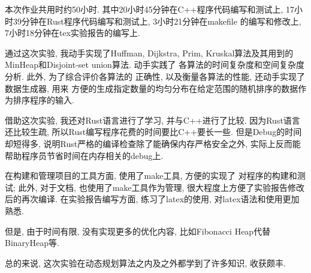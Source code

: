\label{ssub:实验心得}
本次作业共用时约50小时. 其中20小时45分钟在C++程序代码编写和测试上,
17小时39分钟在Rust程序代码编写和测试上, 3小时21分钟在makefile
的编写和修改上, 7小时18分钟在tex实验报告的编写上.\par

通过这次实验, 我动手实现了Huffman, Dijkstra, Prim,
Kruskal算法及其用到的MinHeap和Disjoint-set union算法. 动手实践了
各算法的时间复杂度和空间复杂度分析. 此外, 为了综合评价各算法的
正确性, 以及衡量各算法的性能, 还动手实现了数据生成器, 用来
方便的生成指定数量的均匀分布在给定范围的随机排序的数据作为排序程序的输入.\par

借助这次实验, 我还对Rust语言进行了学习, 并与C++进行了比较.
因为Rust语言还比较生疏, 所以Rust编写程序花费的时间要比C++要长一些.
但是Debug的时间却短得多, 说明Rust严格的编译检查除了能确保内存严格安全之外,
实际上反而能帮助程序员节省时间在内存相关的debug上.\par

在构建和管理项目的工具方面, 使用了make工具, 方便的实现了
对程序的构建和测试; 此外, 对于文档, 也使用了make工具作为管理,
很大程度上方便了实验报告修改后的再次编译. 在实验报告编写方面,
练习了latex的使用, 对latex语法和使用更加熟悉.\par

但是, 由于时间有限, 没有实现更多的优化内容, 比如Fibonacci Heap代替BinaryHeap等.\par

总的来说, 这次实验在动态规划算法之内及之外都学到了许多知识, 收获颇丰.

